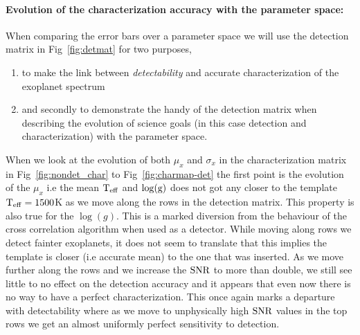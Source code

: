 \paragraph{Evolution of the characterization accuracy with the parameter space:\\}
When comparing the error bars over a parameter space we will use the detection matrix in Fig~\ref{fig:detmat} for two purposes,
\begin{enumerate}
    \item to make the link between \textit{detectability} and accurate characterization of the exoplanet spectrum
    \item and secondly to demonstrate the handy of the detection matrix when describing the evolution of science goals (in this case detection and characterization) with the parameter space.
\end{enumerate}
When we look at the evolution of both $\mu_x$ and $\sigma_x$ in the characterization matrix in Fig~\ref{fig:nondet_char} to Fig~\ref{fig:charmap-det} the first point is the evolution of the $\mu_x$ i.e the mean $\rm{T_{eff}}$ and $\rm{\log(g)}$ does not got any closer to the template $\rm{T_{eff}}=1500$K as we move along the rows in the detection matrix.
This property is also true for the $\log(g)$. 
This is a marked diversion from the behaviour of the cross correlation algorithm when used as a detector.
While moving along rows we detect fainter exoplanets, it does not seem to translate that this implies the template is closer (i.e accurate mean) to the one that was inserted.
As we move further along the rows and we increase the $\rm{SNR}$ to more than double, we still see little to no effect on the detection accuracy and it appears that even now there is no way to have a perfect characterization.
This once again marks a departure with detectability where as we move to unphysically high $\rm{SNR}$ values in the top rows we get an almost uniformly perfect sensitivity to detection.

